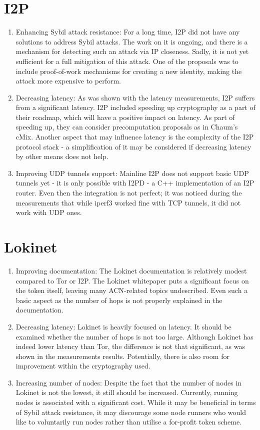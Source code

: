 \section{I2P}
\begin{enumerate}
    \item Enhancing Sybil attack resistance: For a long time, I2P did not have any solutions to address Sybil attacks. The work on it is ongoing, and there is a mechanism for detecting such an attack via IP closeness. Sadly, it is not yet sufficient for a full mitigation of this attack. One of the proposals was to include proof-of-work mechanisms for creating a new identity, making the attack more expensive to perform.
    \item Decreasing latency: As was shown with the latency measurements, I2P suffers from a significant latency. I2P included speeding up cryptography as a part of their roadmap, which will have a positive impact on latency. As part of speeding up, they can consider precomputation proposals as in Chaum’s cMix. Another aspect that may influence latency is the complexity of the I2P protocol stack - a simplification of it may be considered if decreasing latency by other means does not help.
    \item Improving UDP tunnels support: Mainline I2P does not support basic UDP tunnels yet - it is only possible with I2PD - a C++ implementation of an I2P router. Even then the integration is not perfect; it was noticed during the measurements that while iperf3 worked fine with TCP tunnels, it did not work with UDP ones.
\end{enumerate}

\section{Lokinet}
\begin{enumerate}
    \item Improving documentation: The Lokinet documentation is relatively modest compared to Tor or I2P. The Lokinet whitepaper puts a significant focus on the token itself, leaving many ACN-related topics undescribed. Even such a basic aspect as the number of hops is not properly explained in the documentation.
    \item Decreasing latency: Lokinet is heavily focused on latency. It should be examined whether the number of hops is not too large. Although Lokinet has indeed lower latency than Tor, the difference is not that significant, as was shown in the measurements results. Potentially, there is also room for improvement within the cryptography used.
    \item Increasing number of nodes: Despite the fact that the number of nodes in Lokinet is not the lowest, it still should be increased. Currently, running nodes is associated with a significant cost. While it may be beneficial in terms of Sybil attack resistance, it may discourage some node runners who would like to voluntarily run nodes rather than utilise a for-profit token scheme.
\end{enumerate}

